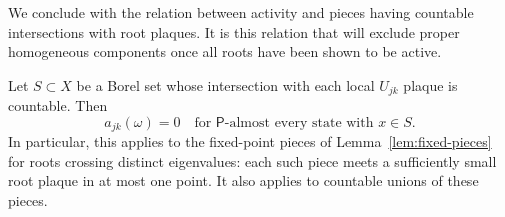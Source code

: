 We conclude with the relation between activity and pieces having
countable intersections with root plaques.
It is this relation that will exclude proper homogeneous components
once all roots have been shown to be active.

\begin{lemma}\label{lem:transverse-inactive}
Let $S\subset X$ be a Borel set whose intersection with each local
$U_{jk}$ plaque is countable.  Then
\[
            a_{jk}(\omega)=0
         \quad\text{for $\mathsf P$-almost every state with }x\in S.
\]
In particular, this applies to the fixed-point pieces of
Lemma~\ref{lem:fixed-pieces} for roots crossing distinct eigenvalues:
each such piece meets a sufficiently small root plaque in at most one
point.  It also applies to countable unions of these pieces.
\end{lemma}

